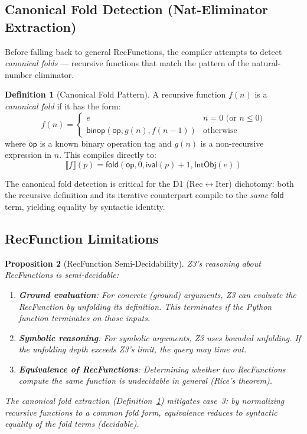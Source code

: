 \documentclass[11pt,a4paper]{report}
\theoremstyle{definition}
\newtheorem{definition}{Definition}[chapter]
\theoremstyle{plain}
\newtheorem{proposition}[definition]{Proposition}
\newcommand{\den}[1]{\llbracket #1 \rrbracket}
\newcommand{\fold}{\mathsf{fold}}
\newcommand{\op}{\mathsf{op}}
\begin{document}
\subsection{Canonical Fold Detection (Nat-Eliminator Extraction)}

Before falling back to general RecFunctions, the compiler attempts
to detect \emph{canonical folds} --- recursive functions that match
the pattern of the natural-number eliminator.

\begin{definition}[Canonical Fold Pattern]
\label{def:canon-fold}
A recursive function $f(n)$ is a \emph{canonical fold} if it has
the form:
\[
  f(n) = \begin{cases}
    e & n = 0 \text{ (or } n \leq 0\text{)} \\
    \mathsf{binop}(\op, g(n), f(n - 1)) & \text{otherwise}
  \end{cases}
\]
where $\op$ is a known binary operation tag and $g(n)$ is a
non-recursive expression in $n$.  This compiles directly to:
\[
  \den{f}(p) = \fold(\op, 0, \mathsf{ival}(p) + 1,
    \mathsf{IntObj}(e))
\]
\end{definition}

The canonical fold detection is critical for the D1 (Rec$\leftrightarrow$Iter)
dichotomy: both the recursive definition and its iterative counterpart
compile to the \emph{same} $\fold$ term, yielding equality by
syntactic identity.

\subsection{RecFunction Limitations}

\begin{proposition}[RecFunction Semi-Decidability]
\label{prop:recfn-semidecide}
Z3's reasoning about RecFunctions is \emph{semi-decidable}:
\begin{enumerate}
  \item \textbf{Ground evaluation}: For concrete (ground) arguments,
    Z3 can evaluate the RecFunction by unfolding its definition.  This
    terminates if the Python function terminates on those inputs.
  \item \textbf{Symbolic reasoning}: For symbolic arguments, Z3 uses
    bounded unfolding.  If the unfolding depth exceeds Z3's limit,
    the query may time out.
  \item \textbf{Equivalence of RecFunctions}: Determining whether
    two RecFunctions compute the same function is undecidable in
    general (Rice's theorem).
\end{enumerate}

The canonical fold extraction (Definition~\ref{def:canon-fold})
mitigates case~3: by normalizing recursive functions to a common
fold form, equivalence reduces to syntactic equality of the fold
terms (decidable).
\end{proposition}
\end{document}
